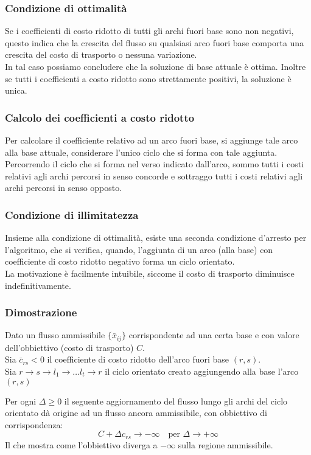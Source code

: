 \documentclass[../template]{subfiles}
\begin{document}
\subsubsection{Condizione di ottimalità}
Se i coefficienti di costo ridotto di tutti gli archi fuori base sono non negativi, questo indica che
la crescita del flusso su qualsiasi arco fuori base comporta una crescita del costo di trasporto o
nessuna variazione.
\\
In tal caso possiamo concludere che la soluzione di base attuale è ottima.
Inoltre se tutti i coefficienti a costo ridotto sono strettamente positivi, la soluzione è unica.

\subsubsection{Calcolo dei coefficienti a costo ridotto}
Per calcolare il coefficiente relativo ad un arco fuori base, si aggiunge tale arco alla base attuale,
considerare l'unico ciclo che si forma con tale aggiunta.
Percorrendo il ciclo che si forma nel verso indicato dall'arco, sommo tutti i costi relativi agli archi
percorsi in senso concorde e sottraggo tutti i costi relativi agli archi percorsi in senso opposto.

\subsubsection{Condizione di illimitatezza}
Insieme alla condizione di ottimalità, esiste una seconda condizione d'arresto per l'algoritmo,
che si verifica, quando, l'aggiunta di un arco (alla base) con coefficiente di costo ridotto negativo
forma un ciclo orientato.
\\
La motivazione è facilmente intuibile, siccome il costo di trasporto diminuisce indefinitivamente.

\subsubsection{Dimostrazione}
Dato un flusso ammissibile $\{\bar{x}_{ij}\}$ corrispondente ad una certa base e con valore dell'obbiettivo
(costo di trasporto) $C$.
\\
Sia $\bar{c}_{rs} < 0$ il coefficiente di costo ridotto dell'arco fuori base $(r, s)$.
\\
Sia $r \to s \to l_1 \to \dots l_t \to r$ il ciclo orientato creato aggiungendo alla base l'arco $(r, s)$

Per ogni $\Delta \ge 0$ il seguente aggiornamento del flusso lungo gli archi del ciclo orientato dà origine
ad un flusso ancora ammissibile, con obbiettivo di corrispondenza:
\[
    C + \Delta c_{rs} \to -\infty \quad \text{per}\,\, \Delta \to +\infty
\]
Il che mostra come l'obbiettivo diverga a $-\infty$ sulla regione ammissibile.
\end{document}
